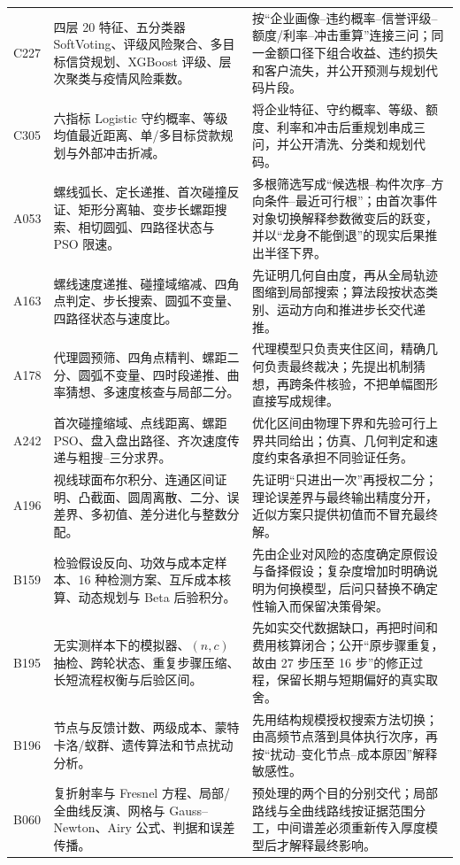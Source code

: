 \documentclass[UTF8,a4paper,12pt]{ctexart}
\begin{document}
\begin{longtable}{p{1.4cm}p{5.2cm}p{7.0cm}}
C227 & 四层 20 特征、五分类器 SoftVoting、评级风险聚合、多目标信贷规划、XGBoost 评级、层次聚类与疫情风险乘数。 &
按“企业画像--违约概率--信誉评级--额度/利率--冲击重算”连接三问；同一金额口径下组合收益、违约损失和客户流失，并公开预测与规划代码片段。\\
C305 & 六指标 Logistic 守约概率、等级均值最近距离、单/多目标贷款规划与外部冲击折减。 &
将企业特征、守约概率、等级、额度、利率和冲击后重规划串成三问，并公开清洗、分类和规划代码。\\
A053 & 螺线弧长、定长递推、首次碰撞反证、矩形分离轴、变步长螺距搜索、相切圆弧、四路径状态与 PSO 限速。 &
多根筛选写成“候选根--构件次序--方向条件--最近可行根”；由首次事件对象切换解释参数微变后的跃变，并以“龙身不能倒退”的现实后果推出半径下界。\\
A163 & 螺线速度递推、碰撞域缩减、四角点判定、步长搜索、圆弧不变量、四路径状态与速度比。 &
先证明几何自由度，再从全局轨迹图缩到局部搜索；算法段按状态类别、运动方向和推进步长交代递推。\\
A178 & 代理圆预筛、四角点精判、螺距二分、圆弧不变量、四时段递推、曲率猜想、多速度核查与局部二分。 &
代理模型只负责夹住区间，精确几何负责最终裁决；先提出机制猜想，再跨条件核验，不把单幅图形直接写成规律。\\
A242 & 首次碰撞缩域、点线距离、螺距 PSO、盘入盘出路径、齐次速度传递与粗搜--三分求界。 &
优化区间由物理下界和先验可行上界共同给出；仿真、几何判定和速度约束各承担不同验证任务。\\
A196 & 视线球面布尔积分、连通区间证明、凸截面、圆周离散、二分、误差界、多初值、差分进化与整数分配。 &
先证明“只进出一次”再授权二分；理论误差界与最终输出精度分开，近似方案只提供初值而不冒充最终解。\\
B159 & 检验假设反向、功效与成本定样本、16 种检测方案、互斥成本核算、动态规划与 Beta 后验积分。 &
先由企业对风险的态度确定原假设与备择假设；复杂度增加时明确说明为何换模型，后问只替换不确定性输入而保留决策骨架。\\
B195 & 无实测样本下的模拟器、$(n,c)$ 抽检、跨轮状态、重复步骤压缩、长短流程权衡与后验区间。 &
先如实交代数据缺口，再把时间和费用核算闭合；公开“原步骤重复，故由 27 步压至 16 步”的修正过程，保留长期与短期偏好的真实取舍。\\
B196 & 节点与反馈计数、两级成本、蒙特卡洛/蚁群、遗传算法和节点扰动分析。 &
先用结构规模授权搜索方法切换；由高频节点落到具体执行次序，再按“扰动--变化节点--成本原因”解释敏感性。\\
B060 & 复折射率与 Fresnel 方程、局部/全曲线反演、网格与 Gauss--Newton、Airy 公式、判据和误差传播。 &
预处理的两个目的分别交代；局部路线与全曲线路线按证据范围分工，中间谱差必须重新传入厚度模型后才解释最终影响。\\

\end{longtable}
\end{document}
